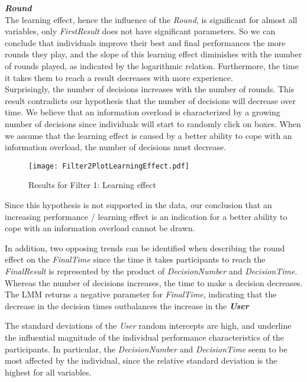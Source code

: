 \textbf{\textit{Round} }\\
The learning effect, hence the influence of the \textit{Round}, is significant for almost all variables, only \textit{FirstResult} does not have significant parameters. So we can conclude that individuals improve their best and final performances the more  rounds they play, and the slope of this learning effect diminishes with the number of rounds played, as indicated by the logarithmic relation. Furthermore, the time it takes them to reach a result decreases with more experience. \\
Surprisingly, the number of decisions increases with the number of rounds. This result contradicts our hypothesis that the number of decisions will decrease over time. We believe that an information overload is characterized by a growing number of decisions since individuals will start to randomly click on boxes. When we assume that the learning effect is caused by a better ability to cope with an information overload, the number of decisions must decrease.
\begin{figure}[H] %
\begin{center}
\texttt{[image: Filter2PlotLearningEffect.pdf]}  
  \caption[Results for Filter 1: Learning effect]{Results for Filter 1: Learning effect\footnotemark}
    \label{fig:Results for Filter 1: Learning effect} 
\end{center}
\end{figure}
Since this hypothesis is not supported in the data, our conclusion that an increasing performance / learning effect is an indication for a better ability to cope with an information overload cannot be drawn.

In addition, two opposing trends can be identified when describing the round effect on the \textit{FinalTime} since the time it takes participants to reach the \textit{FinalResult} is represented by the product of \textit{DecisionNumber} and \textit{DecisionTime}. Whereas the number of decisions increases, the time to make a decision decreases. The \ac{LMM} returns a negative parameter for \textit{FinalTime},  indicating that the decrease in the decision times outbalances the increase in the 
\textbf{\textit{User} }

The standard deviations of the \textit{User} random intercepts are high, and underline the influential magnitude of the individual performance characteristics of the participants. In particular, the \textit{DecisionNumber} and \textit{DecisionTime} seem to be most affected by the individual, since the relative standard deviation is the highest for all variables. 

